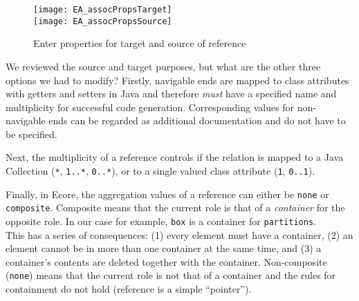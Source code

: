 \begin{itemize}
\vspace{0.5cm}

\begin{figure}[htbp]
	\centering
	  \texttt{[image: EA\_assocPropsTarget]}\\
  \vspace{1cm}
    \texttt{[image: EA\_assocPropsSource]}
	\caption{Enter properties for target and source of reference}
	\label{fig:reference_ends}
\end{figure}
\FloatBarrier

\end{itemize}

We reviewed the source and target purposes, but what are the other three options we had to modify? Firstly, navigable ends are mapped to class attributes with getters and setters in Java and therefore \emph{must} have a specified name and  multiplicity for successful code generation. Corresponding values for non-navigable ends can  be regarded as additional documentation and do not have to be specified.

Next, the multiplicity of a reference controls if the relation is mapped to a Java Collection (\texttt{*},  \texttt{1..*}, \texttt{0..*}), or to a single valued class attribute (\texttt{1}, \texttt{0..1}).

Finally, in Ecore, the aggregation values of a reference can either be \texttt{none} or \texttt{com\-po\-site}.
Composite means that the current role is that of a \emph{container} for the opposite role.
In our case for example, \texttt{box} is a container for \texttt{partitions}.\\
This has a series of consequences: (1) every element must have a container, (2) an element cannot be in more than one container at the same time, and (3) a container's contents are deleted together with the container.
Non-composite (\texttt{none}) means that the current role is not that of a container and the rules for containment do not hold (reference is a simple ``pointer'').

